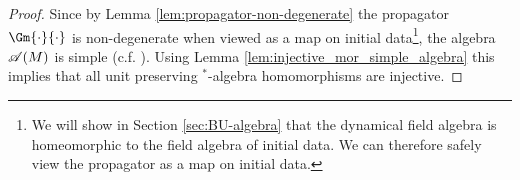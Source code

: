 \begin{proof}
Since by Lemma \ref{lem:propagator-non-degenerate} the propagator $\Gm{\cdot}{\cdot}$ is non-degenerate when viewed as a map on initial data\footnote{We will show in Section \ref{sec:BU-algebra} that the dynamical field algebra is homeomorphic to the field algebra of initial data. We can therefore safely view the propagator as a map on initial data.}, the algebra $\AA(M)$ is simple (c.f. \cite[Scholium 7.1]{baez_segal_zhou}). Using Lemma \ref{lem:injective_mor_simple_algebra} this implies that all unit preserving $^*$-algebra homomorphisms are injective.

\end{proof}
